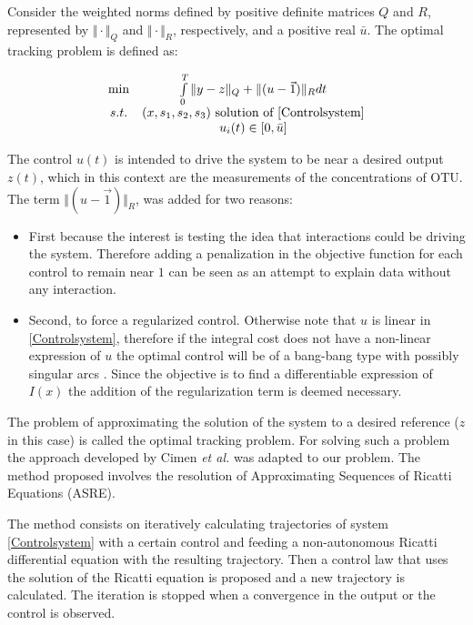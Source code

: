 \documentclass[3p,times]{article}
\begin{document}
 Consider the weighted norms defined by positive definite matrices $Q$ and $R$, represented by $\Vert \cdot \Vert_Q$ and $\Vert \cdot \Vert_R$, respectively, and a positive real $\bar{u}$. The optimal tracking problem is defined as: 

\begin{align}
\label{Optimal Control} \begin{array}{cc} \min &  \int \limits_{0}^{T} \Vert y - z \Vert_Q + \Vert(u -\vec{1}) \Vert_R dt\\
s.t.& 
(x,s_1,s_2,s_3)\mbox{ solution of \eqref{Controlsystem}} \\
&u_i(t) \in [0,\bar{u}]
\end{array}	
\end{align} 

The control $u(t)$ is intended to drive the system to be near a desired output $z(t)$, which in this context are the measurements of the concentrations of OTU. The term $\Vert(u -\vec{1}) \Vert_R$, was added for two reasons:
\begin{itemize}
\item First because the interest is testing the idea that interactions could be driving the system. Therefore adding a penalization in the objective function for each control to remain near $1$ can be seen as an attempt to explain data without any interaction.
\item Second, to force a regularized control. Otherwise note that $u$ is linear in \eqref{Controlsystem}, therefore if the integral cost does not have a non-linear expression of $u$ the optimal control will be of a bang-bang type with possibly singular arcs \cite{harmand2019optimal}. Since the objective is to find a differentiable expression of $I(x)$ the addition of the regularization term is deemed necessary.
\end{itemize} 
The problem of approximating the solution of the system to a desired reference ($z$ in this case) is called the optimal tracking problem. For solving such a problem the approach developed by Cimen \textit{et al.} \cite{Cimen2004, Cimen2008} was adapted to our problem. The method proposed involves the resolution of Approximating Sequences of Ricatti Equations (ASRE). 

The method consists on iteratively calculating trajectories of system \eqref{Controlsystem} with a certain control and feeding a non-autonomous Ricatti differential equation with the resulting trajectory. Then a control law that uses the solution of the Ricatti equation is proposed and a new trajectory is calculated. The iteration is stopped when a convergence in the output or  the control is observed.
\end{document}
